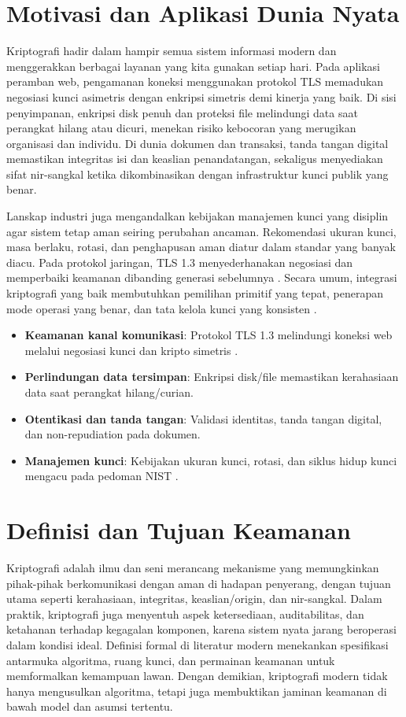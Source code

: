 \documentclass[../main.tex]{subfiles}
\begin{document}
\section{Motivasi dan Aplikasi Dunia Nyata}
Kriptografi hadir dalam hampir semua sistem informasi modern dan menggerakkan berbagai layanan yang kita gunakan setiap hari. Pada aplikasi peramban web, pengamanan koneksi menggunakan protokol TLS memadukan negosiasi kunci asimetris dengan enkripsi simetris demi kinerja yang baik. Di sisi penyimpanan, enkripsi disk penuh dan proteksi file melindungi data saat perangkat hilang atau dicuri, menekan risiko kebocoran yang merugikan organisasi dan individu. Di dunia dokumen dan transaksi, tanda tangan digital memastikan integritas isi dan keaslian penandatangan, sekaligus menyediakan sifat nir-sangkal ketika dikombinasikan dengan infrastruktur kunci publik yang benar.

Lanskap industri juga mengandalkan kebijakan manajemen kunci yang disiplin agar sistem tetap aman seiring perubahan ancaman. Rekomendasi ukuran kunci, masa berlaku, rotasi, dan penghapusan aman diatur dalam standar yang banyak diacu. Pada protokol jaringan, TLS 1.3 menyederhanakan negosiasi dan memperbaiki keamanan dibanding generasi sebelumnya \citep{rfc8446}. Secara umum, integrasi kriptografi yang baik membutuhkan pemilihan primitif yang tepat, penerapan mode operasi yang benar, dan tata kelola kunci yang konsisten \citep{nist_sp_800_57pt1r5}.
\begin{itemize}
  \item \textbf{Keamanan kanal komunikasi}: Protokol TLS 1.3 melindungi koneksi web melalui negosiasi kunci dan kripto simetris \citep{rfc8446}.
  \item \textbf{Perlindungan data tersimpan}: Enkripsi disk/file memastikan kerahasiaan data saat perangkat hilang/curian.
  \item \textbf{Otentikasi dan tanda tangan}: Validasi identitas, tanda tangan digital, dan non-repudiation pada dokumen.
  \item \textbf{Manajemen kunci}: Kebijakan ukuran kunci, rotasi, dan siklus hidup kunci mengacu pada pedoman NIST \citep{nist_sp_800_57pt1r5}.
\end{itemize}

\section{Definisi dan Tujuan Keamanan}
\begin{definition}[Kriptografi]
Kriptografi adalah ilmu dan seni merancang mekanisme yang memungkinkan pihak-pihak berkomunikasi dengan aman di hadapan penyerang, dengan tujuan utama seperti kerahasiaan, integritas, keaslian/origin, dan nir-sangkal. Dalam praktik, kriptografi juga menyentuh aspek ketersediaan, auditabilitas, dan ketahanan terhadap kegagalan komponen, karena sistem nyata jarang beroperasi dalam kondisi ideal. Definisi formal di literatur modern menekankan spesifikasi antarmuka algoritma, ruang kunci, dan permainan keamanan untuk memformalkan kemampuan lawan. Dengan demikian, kriptografi modern tidak hanya mengusulkan algoritma, tetapi juga membuktikan jaminan keamanan di bawah model dan asumsi tertentu.
\end{definition}
\end{document}
